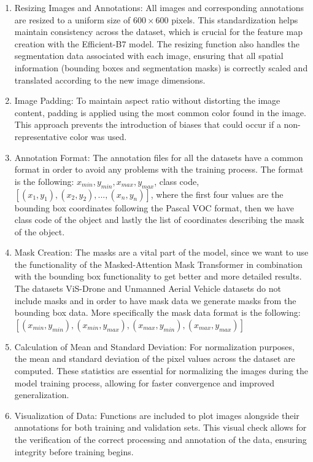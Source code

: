 \begin{enumerate}
    \item Resizing Images and Annotations: All images and corresponding annotations are resized to a uniform size of \(600 \times 600\) pixels. 
    This standardization helps maintain consistency across the dataset, which is crucial for the feature map creation with the Efficient-B7 model. 
    The resizing function also handles the segmentation data associated with each image, ensuring that all spatial information (bounding boxes and 
    segmentation masks) is correctly scaled and translated according to the new image dimensions.

    \item Image Padding: To maintain aspect ratio without distorting the image content, padding is applied using the most common color found in the image. 
    This approach prevents the introduction of biases that could occur if a non-representative color was used.

    \item Annotation Format: The annotation files for all the datasets have a common format in order to avoid any problems with the training process. The format 
    is the following: $x_{min}, y_{min}, x_{max}, y_{max}$, class code, $[(x_1, y_1), (x_2, y_2), ..., (x_n, y_n)]$, where the first four 
    values are the bounding box coordinates following the Pascal VOC format, then we have class code of the object and lastly the 
    list of coordinates describing the mask of the object.

    \item Mask Creation: The masks are a vital part of the model, since we want to use the functionality of the Masked-Attention Mask Transformer 
    in combination with the bounding box functionality to get better and more detailed results. The datasets ViS-Drone and 
    Unmanned Aerial Vehicle datasets do not include masks and in order to have mask data we generate masks from the bounding box 
    data. More specifically the mask data format is the following: \\
    $[(x_{min}, y_{min}), (x_{min}, y_{max}), (x_{max}, y_{min}), (x_{max}, y_{max})]$

    \item Calculation of Mean and Standard Deviation: For normalization purposes, the mean and standard deviation of the pixel values across the dataset are 
    computed. These statistics are essential for normalizing the images during the model training process, 
    allowing for faster convergence and improved generalization.

    \item Visualization of Data: Functions are included to plot images alongside their annotations for both training and validation sets. This visual check 
    allows for the verification of the correct processing and annotation of the data, ensuring integrity before training begins.

  \end{enumerate}



